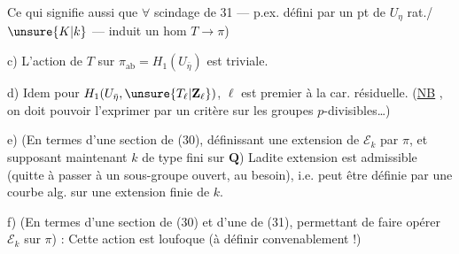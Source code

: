 Ce qui signifie aussi que $\forall$  scindage de 31 --- p.ex. défini par un pt de $U_\eta$ rat./$\unsure{K|k}$ --- induit un hom $T\longrightarrow\pi$)

\noindent c) L'action de $T$ sur $\pi_{\mathrm{ab}}=H_1(U_{\bar\eta})$ est triviale.

\noindent d) Idem pour $H_1(U_{\bar\eta},\unsure{T_\ell|\mathbf Z_\ell})$,  $\ell$ est premier à la car. résiduelle. (\uline{NB}  , on doit pouvoir l'exprimer par un critère sur les groupes $p$-divisibles\ldots)

\noindent e) (En termes d'une section de (30), définissant une extension de $\mathcal E_k$ par $\pi$, et supposant maintenant $k$ de type fini sur $\mathbf Q$) Ladite extension est admissible (quitte à passer à un sous-groupe ouvert,  au besoin), i.e. peut être définie par une courbe alg. sur  une extension finie de $k$.

\noindent f) (En termes d'une section de (30) et d'une de (31), permettant de faire opérer $\mathcal E_k$ sur $\pi$) : Cette action est  loufoque (à définir convenablement !)
